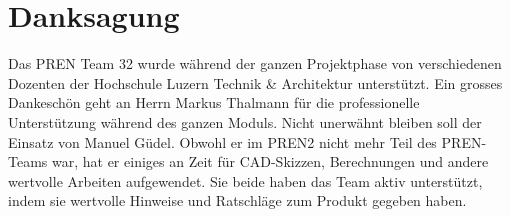 \section{Danksagung}
Das PREN Team 32 wurde während der ganzen Projektphase von 
verschiedenen Dozenten der Hochschule Luzern Technik \& Architektur unterstützt. 
Ein grosses Dankeschön geht an Herrn Markus Thalmann für die professionelle Unterstützung während des
ganzen Moduls.\newline
\newline
Nicht unerwähnt bleiben soll der Einsatz von Manuel Güdel. Obwohl er im PREN2 nicht mehr Teil des
PREN-Teams war, hat er einiges an Zeit für CAD-Skizzen, Berechnungen und andere wertvolle Arbeiten aufgewendet.
Sie beide haben das Team aktiv unterstützt, indem sie wertvolle Hinweise und Ratschläge zum Produkt gegeben haben.
